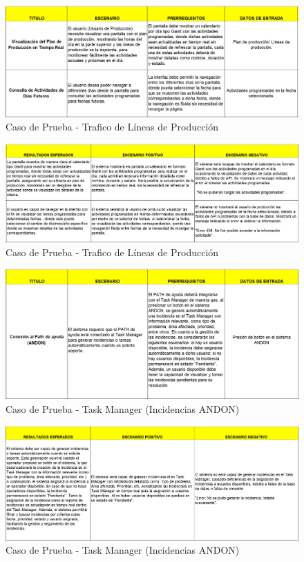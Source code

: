 \documentclass[12pt,letterpaper,spanish, xcolor=table]{report}
\numberwithin{figure}{subsection}
\begin{document}
	\begin{figure}[H]
		\centering
		\includegraphics[width=1.0\textwidth]
		{Imagenes/PathAyuda/CPLineaProduccion.png}
		\caption{Caso de Prueba - Trafico de Líneas de Producción
		}\label{a2}
	\end{figure}
	
	\begin{figure}[H]
		\centering
		\includegraphics[width=1.0\textwidth]
		{Imagenes/PathAyuda/CPLineaProduccion2.png}
		\caption{Caso de Prueba - Trafico de Líneas de Producción
		}\label{a2}
	\end{figure}
	
	\begin{figure}[H]
		\centering
		\includegraphics[width=1.0\textwidth]
		{Imagenes/PathAyuda/CPTask.png}
		\caption{Caso de Prueba - Task Manager (Incidencias ANDON)
		}\label{a2}
	\end{figure}
	
	\begin{figure}[H]
		\centering
		\includegraphics[width=1.0\textwidth]
		{Imagenes/PathAyuda/CPTask2.png}
		\caption{Caso de Prueba - Task Manager (Incidencias ANDON)
		}\label{a2}
	\end{figure}
	
\end{document}
